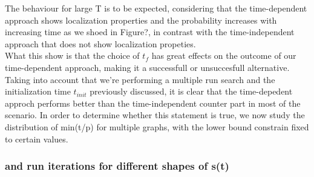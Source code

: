         The behaviour for large T is to be expected, considering that the time-dependent approach shows localization properties and the probability increases with increasing time as we shoed in Figure?, in contrast with the time-independent approach that does not show localization propeties.\\ What this show is that the choice of $t_f$ has great effects on the outcome of our time-dependent approach, making it a successfull or unsuccesfull alternative. Taking into account that we're performing a multiple run search and the initialization time $t_{init}$ previously discussed, it is clear that the time-depedent approch performs better than the time-independent counter part in most of the scenario. In order to determine whether this statement is true, we now study the distribution of min(t/p) for multiple graphs, with the lower bound constrain fixed to certain values.


        \subsubsection*{ and run iterations for different shapes of s(t)}

